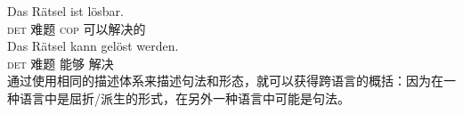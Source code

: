 \eal
\ex 
\gll Das Rätsel ist lösbar.\\
    \textsc{det} 难题 \textsc{cop} 可以解决的\\
\ex 
\gll Das Rätsel kann gelöst werden.\\
     \textsc{det} 难题 能够 解决 \passive\\
\zl
通过使用相同的描述体系来描述句法和形态，就可以获得跨语言的概括：因为在一种语言中是屈折/派生的形式，在另外一种语言中可能是句法。

